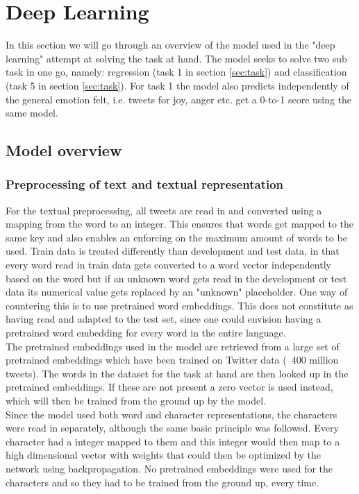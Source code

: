
\section{Deep Learning}
In this section we will go through an overview of the model used in the "deep learning" attempt at solving the task at hand. The model seeks to solve two sub task in one go, namely: regression (task 1 in section \ref{sec:task}) and classification (task 5 in section \ref{sec:task}). For task 1 the model also predicts independently of the general emotion felt, i.e. tweets for joy, anger etc. get a 0-to-1 score using the same model.

\subsection{Model overview}

\subsubsection*{Preprocessing of text and textual representation} \label{sec:preprop}
For the textual preprocessing, all tweets are read in and converted using a mapping from the word to an integer. This ensures that words get mapped to the same key and also enables an enforcing on the maximum amount of words to be used. Train data is treated differently than development and test data, in that every word read in train data gets converted to a word vector independently based on the word but if an unknown word gets read in the development or test data its numerical value gets replaced by an "unknown" placeholder. One way of countering this is to use pretrained word embeddings. This does not constitute as having read and adapted to the test set, since one could envision having a pretrained word embedding for every word in the entire language.\\
The pretrained embeddings used in the model are retrieved from a large set of pretrained embeddings which have been trained on Twitter data (~400 million tweets). The words in the dataset for the task at hand are then looked up in the pretrained embeddings. If these are not present a zero vector is used instead, which will then be trained from the ground up by the model.\\
Since the model used both word and character representations, the characters were read in separately, although the same basic principle was followed. Every character had a integer mapped to them and this integer would then map to a high dimensional vector with weights that could then be optimized by the network using backpropagation. No pretrained embeddings were used for the characters and so they had to be trained from the ground up, every time.

